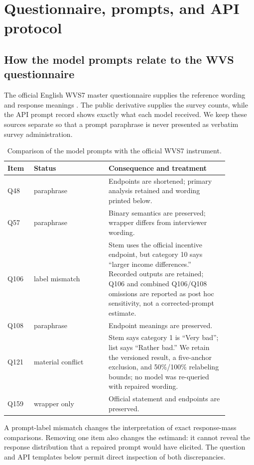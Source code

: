 \section{Questionnaire, prompts, and API protocol}
\label{app:instrument}

\subsection{How the model prompts relate to the WVS questionnaire}
The official English WVS7 master questionnaire supplies the reference wording and
response meanings \citep{wvs7masterquestionnaire}. The public derivative supplies the
survey counts, while the API prompt record shows exactly what each model received. We
keep these sources separate so that a prompt paraphrase is never presented as verbatim
survey administration.

\begin{table}[!htbp]
\centering
\caption{Comparison of the model prompts with the official WVS7 instrument.}
\label{tab:prompt-audit}
\small
\begin{tabular}{p{0.10\linewidth}p{0.30\linewidth}p{0.48\linewidth}}
\toprule
\rowcolor{tablehead}
Item & Status & Consequence and treatment \\
\midrule
Q48 & paraphrase & Endpoints are shortened; primary analysis retained and wording printed below. \\
Q57 & paraphrase & Binary semantics are preserved; wrapper differs from interviewer wording. \\
Q106 & label mismatch & Stem uses the official incentive endpoint, but category 10 says
“larger income differences.” Recorded outputs are retained; Q106 and combined Q106/Q108
omissions are reported as post hoc sensitivity, not a corrected-prompt estimate. \\
Q108 & paraphrase & Endpoint meanings are preserved. \\
Q121 & material conflict & Stem says category 1 is “Very bad”; list says “Rather bad.”
We retain the versioned result, a five-anchor exclusion, and 50\%/100\% relabeling
bounds; no model was re-queried with repaired wording. \\
Q159 & wrapper only & Official statement and endpoints are preserved. \\
\bottomrule
\end{tabular}
\end{table}

A prompt-label mismatch changes the interpretation of exact response-mass
comparisons. Removing one item also changes the estimand: it cannot reveal
the response distribution that a repaired prompt would have elicited.
The question and API templates below permit direct inspection of both
discrepancies.

